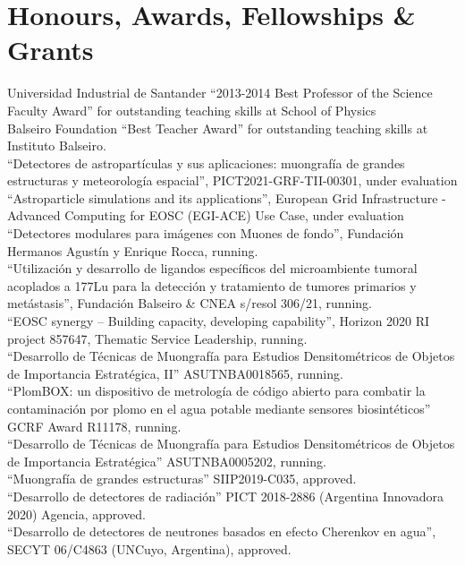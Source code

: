 \ifeng
\section*{Honours, Awards, Fellowships \& Grants}
\noindent
{} Universidad Industrial de Santander ``2013-2014 Best Professor of the Science Faculty Award'' for outstanding teaching skills at School of Physics\\
 Balseiro Foundation ``Best Teacher Award'' for outstanding teaching skills at Instituto Balseiro.\\
 ``Detectores de astropartículas y sus aplicaciones: muongrafía de grandes estructuras y meteorología espacial'', PICT2021-GRF-TII-00301, under evaluation\\
 ``Astroparticle simulations and its applications'', European Grid Infrastructure - Advanced Computing for EOSC (EGI-ACE) Use Case, under evaluation\\
 ``Detectores modulares para imágenes con Muones de fondo'', Fundación Hermanos Agustín y Enrique Rocca, running.\\
 ``Utilización y desarrollo de ligandos específicos del microambiente tumoral acoplados a 177Lu para la detección y tratamiento de tumores primarios y metástasis'', Fundación Balseiro \& CNEA s/resol 306/21, running.\\
 ``EOSC synergy – Building capacity, developing capability'', Horizon 2020 RI project 857647, Thematic Service Leadership, running.\\
 ``Desarrollo de Técnicas de Muongrafía para Estudios Densitométricos de Objetos de Importancia Estratégica, II'' ASUTNBA0018565, running.\\
 ``PlomBOX: un dispositivo de metrología de código abierto para combatir la contaminación por plomo en el agua potable mediante sensores biosintéticos'' GCRF Award R11178, running.\\
 ``Desarrollo de Técnicas de Muongrafía para Estudios Densitométricos de Objetos de Importancia Estratégica'' ASUTNBA0005202, running.\\
 ``Muongrafía de grandes estructuras'' SIIP2019-C035, approved.\\
 ``Desarrollo de detectores de radiación'' PICT 2018-2886 (Argentina Innovadora 2020) Agencia, approved.\\
 ``Desarrollo de detectores de neutrones basados en efecto Cherenkov en agua'', SECYT 06/C4863 (UNCuyo, Argentina), approved.\\
